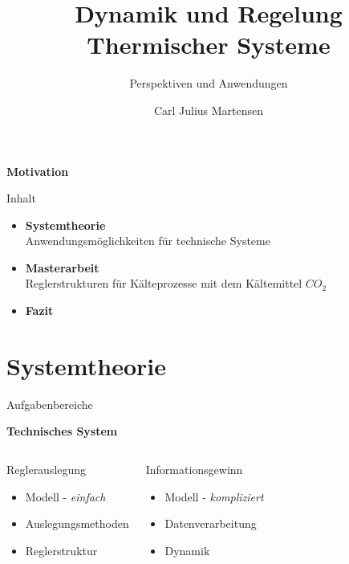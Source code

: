 \documentclass[fleqn,11pt,aspectratio=43]{beamer}
\title{Dynamik und Regelung Thermischer Systeme}
\subtitle{Perspektiven und Anwendungen}
\author{Carl Julius Martensen}
\begin{document}
\begin{frame}[plain]
\titlepage
\end{frame}

\begin{frame}[plain]
\centering
\textbf{{\huge Motivation}}
\end{frame}


\begin{frame}{Inhalt}
\begin{itemize}
\item {{\Large \textbf{Systemtheorie} }\\  Anwendungsmöglichkeiten für technische Systeme\vspace{0.3cm}}
\item {{\Large \textbf{Masterarbeit} }\\  Reglerstrukturen für Kälteprozesse mit dem Kältemittel $CO_2$\vspace{0.3cm}} 
\item {{\Large \textbf{Fazit} }} 
\end{itemize}
\end{frame}

\section{Systemtheorie}

\begin{frame}{Aufgabenbereiche}

\begin{exampleblock}{}
	\centering
	\textbf{ Technisches System}
\end{exampleblock}

  \begin{columns}[onlytextwidth]
	\begin{alertblock}{Reglerauslegung}
		\begin{itemize}
			\item Modell - \textit{einfach}
			\item Auslegungsmethoden
			\item Reglerstruktur
		\end{itemize}
	\end{alertblock}
	\begin{block}{Informationsgewinn}
		\begin{itemize}
			\item Modell - \textit{kompliziert}
			\item Datenverarbeitung
			\item Dynamik
		\end{itemize}
	\end{block}
  \end{columns}

\end{frame}
\end{document}

